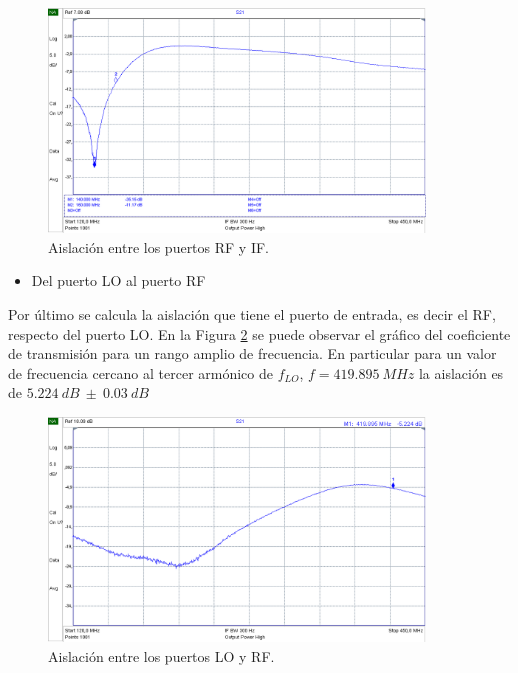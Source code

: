 \documentclass[a4paper,10pt]{article}
\begin{document}
	\begin{figure}[!htb]
		\centering
		\includegraphics[width=10cm]{Images/aislacion2.png}
		\caption{Aislaci\'on entre los puertos RF y IF.}
		\label{isolation2}
	\end{figure}
	
	\begin{itemize}
		\item Del puerto LO al puerto RF
	\end{itemize}
	
	\indent Por \'ultimo se calcula la aislaci\'on que tiene el puerto de 
	entrada, es decir el RF, respecto del puerto LO. En la Figura 
	\ref{isolation3} se puede observar el gr\'afico del coeficiente de 
	transmisi\'on para un rango amplio de frecuencia. En particular para un 
	valor de frecuencia cercano al tercer arm\'onico de 
	$f_{LO}$, $f=419.895~MHz$ la aislaci\'on es de $5.224~dB~\pm~0.03~dB$
	
	\begin{figure}[!htb]
		\centering
		\includegraphics[width=10cm]{Images/aislacion3.png}
		\caption{Aislaci\'on entre los puertos LO y RF.}
		\label{isolation3}
	\end{figure}	
	
\end{document}
